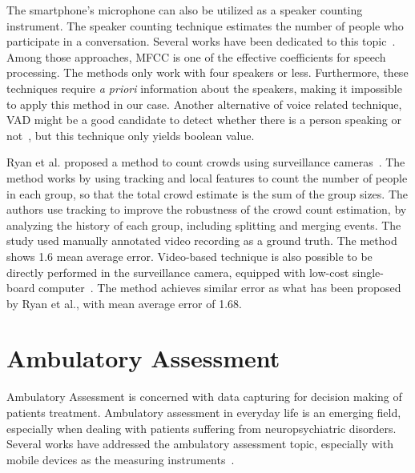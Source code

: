 	The smartphone's microphone can also be utilized as a speaker counting instrument. The speaker counting technique estimates the number of people who participate in a conversation. Several works have been dedicated to this topic~\cite{thesis067,thesis074,thesis071}. Among those approaches, \ac{MFCC} is one of the effective coefficients for speech processing. The methods only work with four speakers or less.
	Furthermore, these techniques require \textit{a priori} information about the speakers, making it impossible to apply this method in our case. Another alternative of voice related technique, VAD might be a good candidate to detect whether there is a person speaking or not~\cite{thesis070}, but this technique only yields boolean value.
	
	Ryan et al. proposed a method to count crowds using surveillance cameras~\cite{thesis034}. The method works by using tracking and local features to count the number of people in each group, so that the total crowd estimate is the sum of the group sizes. The authors use tracking to improve the robustness of the crowd count estimation, by analyzing the history of each group, including splitting and merging events. The study used manually annotated video recording as a ground truth. The method shows 1.6 mean average error. Video-based technique is also possible to be directly performed in the surveillance camera, equipped with low-cost single-board computer~\cite{thesis055}. The method achieves similar error as what has been proposed by Ryan et al., with mean average error of 1.68.



	





\section{Ambulatory Assessment} %
\label{sec:ambulatory_assessment}
Ambulatory Assessment is concerned with data capturing for decision making of patients treatment. Ambulatory assessment in everyday life is an emerging field, especially when dealing with patients suffering from neuropsychiatric disorders. Several works have addressed the ambulatory assessment topic, especially with mobile devices as the measuring instruments~\cite{thesis001,thesis031,thesis030,thesis015}.

